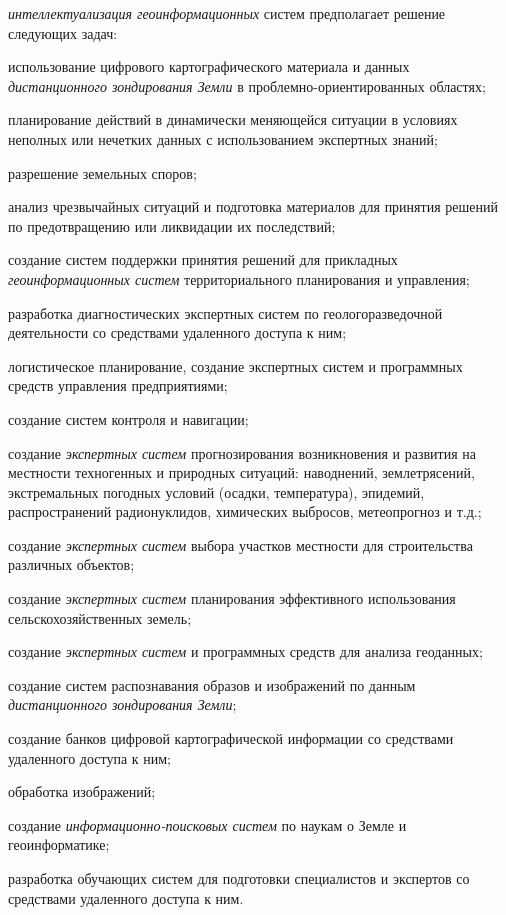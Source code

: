 \textit{интеллектуализация геоинформационных} систем предполагает решение следующих задач:
\begin{textitemize}
	\item использование цифрового картографического материала и данных \textit{дистанционного зондирования Земли} в проблемно-ориентированных областях;
	\item планирование действий в динамически меняющейся ситуации в условиях неполных или нечетких данных с использованием экспертных знаний; 
	\item разрешение земельных споров;
	\item анализ чрезвычайных ситуаций и подготовка материалов для принятия решений по предотвращению или ликвидации их последствий; 
	\item создание систем поддержки принятия решений для прикладных \textit{геоинформационных систем} территориального планирования и управления; 
	\item разработка диагностических экспертных систем по геологоразведочной деятельности со средствами удаленного доступа к ним;
	\item логистическое планирование, создание экспертных систем и программных средств управления предприятиями;
	\item создание систем контроля и навигации;
	\item создание \textit{экспертных систем} прогнозирования возникновения и развития на местности техногенных и природных ситуаций: наводнений, землетрясений, экстремальных погодных условий (осадки, температура), эпидемий, распространений радионуклидов, химических выбросов, метеопрогноз и т.д.;
	\item создание \textit{экспертных систем} выбора участков местности для строительства различных объектов;
	\item создание \textit{экспертных систем} планирования эффективного использования сельскохозяйственных земель;
	\item создание \textit{экспертных систем} и программных средств для анализа геоданных;
	\item создание систем распознавания образов и изображений по данным \textit{дистанционного зондирования Земли};
	\item создание банков цифровой картографической информации со средствами удаленного доступа к ним;
	\item обработка изображений;
	\item создание \textit{информационно-поисковых систем} по наукам о Земле и геоинформатике;
	\item разработка обучающих систем для подготовки специалистов и экспертов со средствами удаленного доступа к ним.
\end{textitemize}


